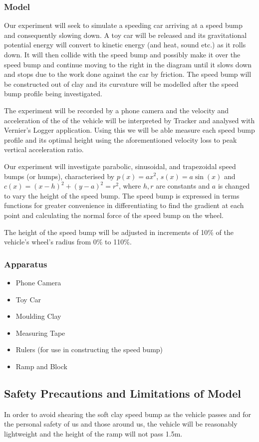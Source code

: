 \documentclass[11pt,a4paper]{article}
\begin{document}
  \subsubsection{Model}
Our experiment will seek to simulate a speeding car arriving at a speed bump and
consequently slowing down. A toy car will be released and its gravitational
potential energy will convert to kinetic energy (and heat, sound etc.) as it
rolls down. It will then collide with the speed bump and possibly make it over
the speed bump and continue moving to the right in the diagram until it slows
down and stops due to the work done against the car by friction. The speed bump
will be constructed out of clay and its curvature will be modelled after the
speed bump profile being investigated.

The experiment will be recorded by a phone camera and the velocity and
acceleration of the of the vehicle will be interpreted by Tracker and analysed
with Vernier's Logger application. Using this we will be able measure each speed
bump profile and its optimal height using the aforementioned velocity loss to
peak vertical acceleration ratio.

Our experiment will investigate parabolic, sinusoidal, and trapezoidal speed
bumps (or humps), characterised by $p(x) = ax^2$, $s(x) = a\sin(x)$ and $c(x) =
(x-h)^2 + (y - a)^2 = r^2$, where $h,r$ are constants and $a$ is changed to vary
the height of the speed bump. The speed bump is expressed in terms functions for
greater convenience in differentiating to find the gradient at each point and
calculating the normal force of the speed bump on the wheel.

The height of the speed bump will be adjusted in increments of 10\% of the vehicle's
wheel's radius from 0\% to 110\%.

\subsubsection{Apparatus}
\begin{itemize}
  \item Phone Camera
  \item Toy Car
  \item Moulding Clay
  \item Measuring Tape
  \item Rulers (for use in constructing the speed bump)
  \item Ramp and Block
\end{itemize}
\subsection{Safety Precautions and Limitations of Model}
In order to avoid shearing the soft clay speed bump as the vehicle passes and
for the personal safety of us and those around us, the vehicle will be
reasonably lightweight and the height of the ramp will not pass 1.5m.
\end{document}
